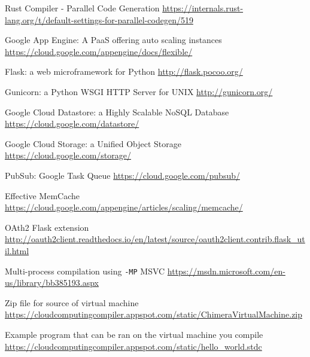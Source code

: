 \documentclass[conference]{IEEEtran}
\begin{document}
\begin{thebibliography}{00}

    Rust Compiler - Parallel Code Generation
    \url{https://internals.rust-lang.org/t/default-settings-for-parallel-codegen/519}


    Google App Engine: A PaaS offering auto scaling instances
    \url{https://cloud.google.com/appengine/docs/flexible/}

    Flask: a web microframework for Python
    \url{http://flask.pocoo.org/}

    Gunicorn: a Python WSGI HTTP Server for UNIX
    \url{http://gunicorn.org/}

    Google Cloud Datastore: a Highly Scalable NoSQL Database
    \url{https://cloud.google.com/datastore/}

    Google Cloud Storage: a Unified Object Storage
    \url{https://cloud.google.com/storage/}

   PubSub: Google Task Queue
    \url{https://cloud.google.com/pubsub/}

   Effective MemCache
    \url{https://cloud.google.com/appengine/articles/scaling/memcache/} 

   OAth2 Flask extension
    \url{http://oauth2client.readthedocs.io/en/latest/source/oauth2client.contrib.flask_util.html}

 	Multi-process compilation using \texttt{-MP} MSVC
 	\url{https://msdn.microsoft.com/en-us/library/bb385193.aspx}
 	
	Zip file for source of virtual machine
	\url{https://cloudcomputingcompiler.appspot.com/static/ChimeraVirtualMachine.zip}
	
    Example program that can be ran on the virtual machine you compile
    \url{https://cloudcomputingcompiler.appspot.com/static/hello_world.stdc}
    
\end{thebibliography}
\end{document}
